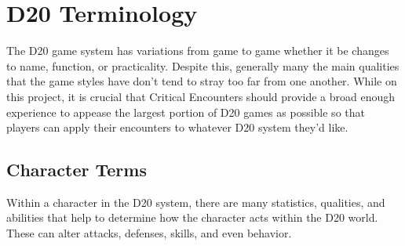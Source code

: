 \documentclass[12pt,a4paper]{report}
\begin{document}
	\section{D20 Terminology}
	The D20 game system has variations from game to game whether it be changes to name, function, or practicality. Despite this, generally many the main qualities that the game styles have don't tend to stray too far from one another. While on this project, it is crucial that Critical Encounters should provide a broad enough experience to appease the largest portion of D20 games as possible so that players can apply their encounters to whatever D20 system they'd like. 
		\subsection{Character Terms}
		Within a character in the D20 system, there are many statistics, qualities, and abilities that help to determine how the character acts within the D20 world. These can alter attacks, defenses, skills, and even behavior.
\end{document}
